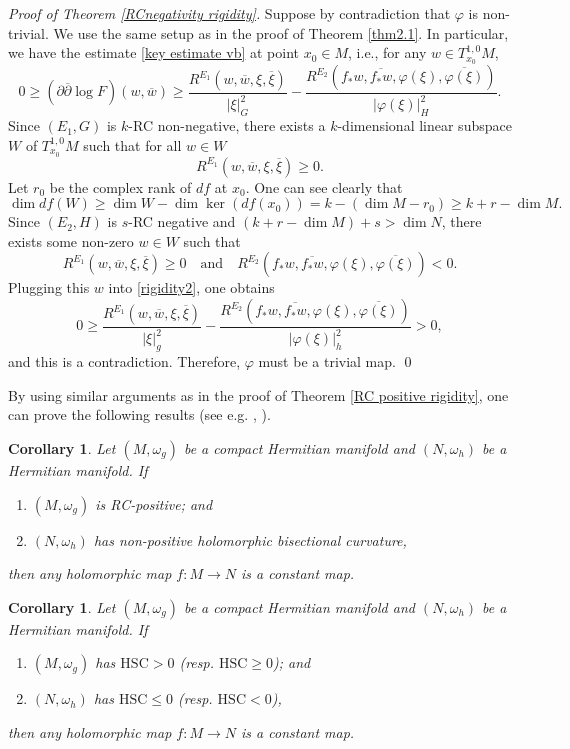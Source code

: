 \documentclass[12pt]{amsart}
\newcommand\bp{{\bar\partial}}
\theoremstyle{plain}
\newtheorem{cor}[thm]{Corollary}
\theoremstyle{definition}
\newcommand{\bcorollary}{\begin{cor}}
\newcommand{\ecorollary}{\end{cor}}
\newcommand{\p}{\partial}
\renewcommand{\bar}{\overline}
\renewcommand{\phi}{\varphi}
\newcommand{\beq}{\begin{equation}}
\newcommand{\eeq}{\end{equation}}
\newcommand{\bd}{\begin{enumerate}}
\newcommand{\ed}{\end{enumerate}}
\newcommand{\qtq}[1]{\quad\mbox{#1}\quad}
\renewcommand{\bp}{\bar{\partial}}
\renewcommand{\>}{\rightarrow}
\numberwithin{equation}{section} %
\begin{document}
\noindent \emph{Proof of Theorem \ref{RCnegativity rigidity}.}
Suppose by contradiction that $\phi$ is non-trivial.
We use the same setup as in the proof of Theorem \ref{thm2.1}.
In particular, we have the estimate \eqref{key estimate vb} at point $x_0\in M$, i.e., for any $w\in T^{1,0}_{x_0}M$,
\beq
0 \ge \left(\p\bp\log F\right)(w,\bar w)
\ge \frac{R^{E_1}\left(w,\bar w,\xi,\bar \xi\right)}{|\xi|_G^2} -\frac{ R^{E_2}\left(f_*w,\bar{f_*w},\phi(\xi),\bar{\phi(\xi)}\right) }{|\phi(\xi)|^2_H} .
\label{rigidity2}
\eeq
Since $(E_1,G)$ is $k$-RC non-negative,
there exists a $k$-dimensional linear subspace $W$ of $T_{x_0}^{1,0}M$ such that for all $w\in W$
\[
R^{E_1}\left(w,\bar w,\xi,\bar \xi\right)\ge 0.
\]
Let $r_0$ be the complex rank of $df$ at $x_0$. One can see clearly that
\[
\dim df(W)\ge \dim W-\dim \ker\left(df(x_0)\right)= k-(\dim M-r_0)\ge k+r-\dim M.
\]
Since  $(E_2, H)$ is $s$-RC negative and $\left(k+r-\dim M\right)+s>\dim N$, there exists some non-zero  $w\in W$ such that
\[
R^{E_1}\left(w,\bar w,\xi,\bar \xi\right)\ge 0\qtq{and} R^{E_2}\left(f_*w,\bar{f_*w},\phi(\xi),\bar{\phi(\xi)}\right)< 0.
\]
Plugging this $w$ into \eqref{rigidity2}, one obtains
\beq
0
\ge \frac{R^{E_1}\left(w,\bar w,\xi,\bar \xi\right)}{|\xi|_g^2} -\frac{ R^{E_2}\left(f_*w,\bar{f_*w},\phi(\xi),\bar{\phi(\xi)}\right) }{|\phi(\xi)|^2_h}
>0,
\eeq and this is
a contradiction. Therefore,  $\phi$ must be a trivial map. \qed



\baselineskip





\noindent By using similar arguments as in the proof of Theorem \ref{RC positive rigidity},  one can prove  the following 
results (see e.g. \cite{Yan18}, \cite{Yan24}). \bcorollary  Let
$(M,\omega_g)$ be a compact Hermitian manifold and $(N,\omega_h)$ be
a Hermitian manifold. If \bd  \item $(M,\omega_g)$ is RC-positive;
and
\item $(N,\omega_h)$ has non-positive holomorphic bisectional curvature,
\ed
then any holomorphic map $f:M\>N$ is a constant map.
\ecorollary

\baselineskip

\bcorollary  Let
$(M,\omega_g)$ be a compact Hermitian manifold and $(N,\omega_h)$ be
a Hermitian manifold. If \bd  \item $(M,\omega_g)$  has  $\mathrm{HSC}>0$ (resp. $\mathrm{HSC}\geq 0$);
and
\item $(N,\omega_h)$ has $\mathrm{HSC}\leq 0$ (resp. $\mathrm{HSC}< 0$),
\ed
then any holomorphic map $f:M\>N$ is a constant map.
\ecorollary
\end{document}
